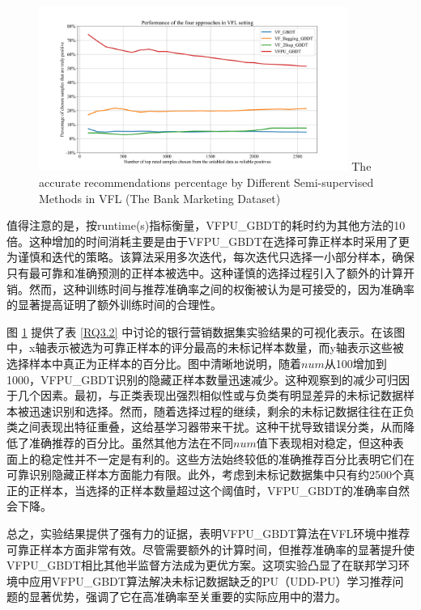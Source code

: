\vspace{-0.1cm}
\begin{figure}[h]
	\centering 
	\includegraphics[width=0.9\textwidth]{chapters/imgs/Figure 5 in JPEG format}
	{\centering \wuhao The accurate recommendations percentage by Different Semi-supervised Methods in VFL (The Bank Marketing Dataset)}
	\label{fig:GBDT}
\end{figure}
\vspace{-0.35cm}

值得注意的是，按runtime(s)指标衡量，VFPU\_GBDT的耗时约为其他方法的10倍。这种增加的时间消耗主要是由于VFPU\_GBDT在选择可靠正样本时采用了更为谨慎和迭代的策略。该算法采用多次迭代，每次迭代只选择一小部分样本，确保只有最可靠和准确预测的正样本被选中。这种谨慎的选择过程引入了额外的计算开销。然而，这种训练时间与推荐准确率之间的权衡被认为是可接受的，因为准确率的显著提高证明了额外训练时间的合理性。

图  \ref{fig:GBDT} 提供了表 \ref{RQ3.2} 中讨论的银行营销数据集实验结果的可视化表示。在该图中，x轴表示被选为可靠正样本的评分最高的未标记样本数量，而y轴表示这些被选择样本中真正为正样本的百分比。图中清晰地说明，随着$num$从100增加到1000，VFPU\_GBDT识别的隐藏正样本数量迅速减少。这种观察到的减少可归因于几个因素。最初，与正类表现出强烈相似性或与负类有明显差异的未标记数据样本被迅速识别和选择。然而，随着选择过程的继续，剩余的未标记数据往往在正负类之间表现出特征重叠，这给基学习器带来干扰。这种干扰导致错误分类，从而降低了准确推荐的百分比。虽然其他方法在不同$num$值下表现相对稳定，但这种表面上的稳定性并不一定是有利的。这些方法始终较低的准确推荐百分比表明它们在可靠识别隐藏正样本方面能力有限。此外，考虑到未标记数据集中只有约2500个真正的正样本，当选择的正样本数量超过这个阈值时，VFPU\_GBDT的准确率自然会下降。

总之，实验结果提供了强有力的证据，表明VFPU\_GBDT算法在VFL环境中推荐可靠正样本方面非常有效。尽管需要额外的计算时间，但推荐准确率的显著提升使VFPU\_GBDT相比其他半监督方法成为更优方案。这项实验凸显了在联邦学习环境中应用VFPU\_GBDT算法解决未标记数据缺乏的PU（UDD-PU）学习推荐问题的显著优势，强调了它在高准确率至关重要的实际应用中的潜力。

